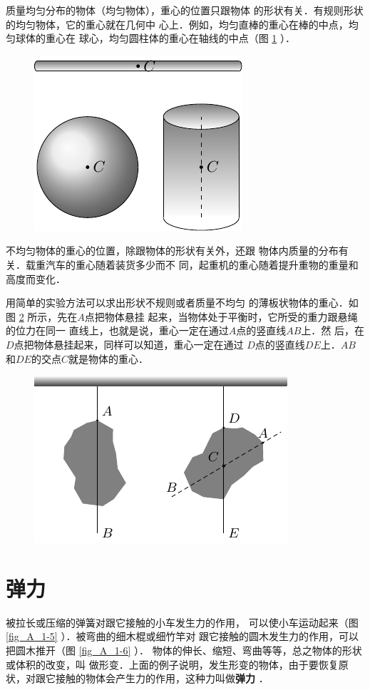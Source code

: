     质量均匀分布的物体（均匀物体），重心的位置只跟物体
的形状有关．有规则形状的均匀物体，它的重心就在几何中
心上．例如，均匀直棒的重心在棒的中点，均匀球体的重心在
球心，均匀圆柱体的重心在轴线的中点（图 \ref{fig_A_1-3} ）．

 \begin{figure} [htp]\centering
\includegraphics{fig/A/1-3.pdf} 
\caption{} \label{fig_A_1-3} 
 \end{figure} 

    不均匀物体的重心的位置，除跟物体的形状有关外，还跟
物体内质量的分布有关．载重汽车的重心随着装货多少而不
同，起重机的重心随着提升重物的重量和高度而变化．

    用简单的实验方法可以求出形状不规则或者质量不均匀
的薄板状物体的重心．如图 \ref{fig_A_1-4} 所示，先在$A$点把物体悬挂
起来，当物体处于平衡时，它所受的重力跟悬绳的位力在同一
直线上，也就是说，重心一定在通过$A$点的竖直线$AB$上．然
后，在$D$点把物体悬挂起来，同样可以知道，重心一定在通过
$D$点的竖直线$DE$上．$AB$和$DE$的交点$C$就是物体的重心．


\begin{figure} [htp]
\centering
\includegraphics{fig/A/1-4.pdf} 
\caption{} \label{fig_A_1-4} 
\end{figure} 

\section{弹力} 
被拉长或压缩的弹簧对跟它接触的小车发生力的作用，
可以使小车运动起来（图 \ref{fig_A_1-5} ）．被弯曲的细木棍或细竹竿对
跟它接触的圆木发生力的作用，可以把圆木推开（图 \ref{fig_A_1-6} ）．
物体的伸长、缩短、弯曲等等，总之物体的形状或体积的改变，叫
做形变．上面的例子说明，发生形变的物体，由于要恢复原
状，对跟它接触的物体会产生力的作用，这种力叫做\textbf{弹力} ．

